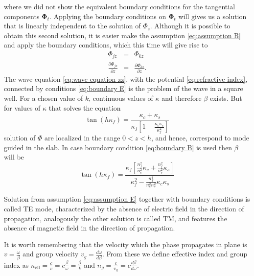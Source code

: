 \documentclass[12pt,twoside,english]{book}
\renewcommand{\~}{\perispomeni}%
\numberwithin{equation}{section}
\numberwithin{figure}{section}
\begin{document}
where we did not show the equivalent boundary conditions for the tangential components $\mathbf{\Phi}_{t}$. Applying the boundary conditions on $\mathbf{\Phi}_{t}$ will gives us a solution that is linearly independent to the solution of $\Phi_{z}$. Although it is possible to obtain this second solution, it is easier make the assumption \ref{eq:assumption B} and apply the boundary conditions, which this time will give rise to
\begin{subequations}
\begin{eqnarray}
\Phi_{jz} & = & \Phi_{kz}\label{eq:boundary Bz}\\
\frac{\partial\Phi_{jz}}{\partial z} & = & \frac{\partial\Phi_{kz}}{\partial z}.\label{eq:boundary dBz}\end{eqnarray}
\label{eq:boundary B}\end{subequations}
The wave equation \ref{eq:wave equation zz}, with the potential \ref{eq:refractive index}, connected by conditions \ref{eq:boundary E} is the problem of the wave in a square well. For a chosen value of $k$, continuous values of $\kappa$ and therefore $\beta$ exists. But for values of $\kappa$ that solves the equation
\begin{equation}
\tan\left(h\kappa_{f}\right)=\frac{\kappa_{c}+\kappa_{s}}{\kappa_{f}\left[1-\frac{\kappa_{c}\kappa_{s}}{\kappa_{f}^{2}}\right]}
\label{eq:TE transcedental}
\end{equation}
solution of $\Phi$ are localized in the range $0<z<h$, and hence, correspond to mode guided in the slab. In case boundary condition \ref{eq:boundary B} is used then $\beta$ will be
\begin{equation}
\tan\left(h\kappa_{f}\right)=\frac{\kappa_{f}\left[\frac{n_{f}^{2}}{n_{c}^{2}}\kappa_{c}+\frac{n_{f}^{2}}{n_{s}^{2}}\kappa_{s}\right]}{\kappa_{f}^{2}-\frac{n_{f}^{4}}{n_{c}^{2}n_{s}^{2}}\kappa_{c}\kappa_{s}}
\label{eq:TM transcedental}
\end{equation}

Solution from assumption \ref{eq:assumption E} together with boundary conditions \label{eq:boundary E} is called \gls{TE} mode, characterized by the absence of electric field in the direction of propagation, analogously the other solution is called \gls{TM}, and features the absence of magnetic field in the direction of propagation.


It is worth remembering that the velocity which the phase propagates in plane is $v=\frac{\omega}{\beta}$ and group velocity $v_{g}=\frac{d\omega}{d\beta}$. From these we define effective index and group index as $n_{\mbox{eff}}=\frac{c}{v}=c\frac{\beta}{\omega}=\frac{\beta}{k}$ and $n_{g}=\frac{c}{v_{g}}=c\frac{d\beta}{d\omega}$.
\end{document}
